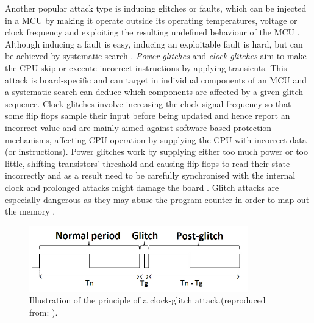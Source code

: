 	
	Another popular attack type is inducing glitches or faults, which can be injected in a MCU by making it operate outside its operating temperatures, voltage or clock frequency and exploiting the resulting undefined behaviour of the MCU \citep{sergei:thesis} \citep{avr_mega}. Although inducing a fault is easy, inducing an exploitable fault is hard, but can be achieved by systematic search \citep{sergei:thesis} \citep{glitches_paper} \citep{website:riscure}. \emph{Power glitches} and \emph{clock glitches} aim to make the CPU skip or execute incorrect instructions by applying transients. This attack is board-specific and can target in individual components of an MCU and a systematic search can deduce which components are affected by a given glitch sequence. Clock glitches involve increasing the clock signal frequency so that some flip flops sample their input before being updated and hence report an incorrect value \citep{sergei:thesis} and are mainly aimed against software-based protection mechanisms, affecting CPU operation by supplying the CPU with incorrect data (or instructions). Power glitches work by supplying either too much power or too little, shifting transistors' threshold and causing flip-flops to read their state incorrectly and as a result need to be carefully synchronised with the internal clock and prolonged attacks might damage the board \citep{sergei:thesis}. Glitch attacks are especially dangerous as they may abuse the program counter in order to map out the memory \citep{glitches_paper} \citep{anderson:cautionary_note} \citep{sergei:thesis}.

	\begin{figure}
		\center
		\includegraphics[scale=0.7]{img/clock_glitch.png}
		\caption{\footnotesize Illustration of the principle of a clock-glitch attack.(reproduced from: \protect\citep{glitches_paper}).}
		\label{fig:glitch}		
	\end{figure}

